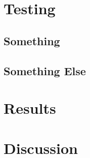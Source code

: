 \documentclass[10pt,a4paper]{article}
\begin{document}
\section{Testing}

\subsection{Something}


\subsection{Something Else}



\section{Results}

\section{Discussion}



\end{document}
